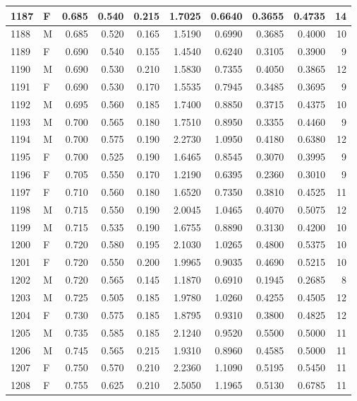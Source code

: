 \documentclass[9pt,twocolumn,twoside,]{pnas-new}
\begin{document}
\begin{tabular}{l|l|r|r|r|r|r|r|r|r}
\hline
1187 & F & 0.685 & 0.540 & 0.215 & 1.7025 & 0.6640 & 0.3655 & 0.4735 & 14\\
\hline
1188 & M & 0.685 & 0.520 & 0.165 & 1.5190 & 0.6990 & 0.3685 & 0.4000 & 10\\
\hline
1189 & F & 0.690 & 0.540 & 0.155 & 1.4540 & 0.6240 & 0.3105 & 0.3900 & 9\\
\hline
1190 & M & 0.690 & 0.530 & 0.210 & 1.5830 & 0.7355 & 0.4050 & 0.3865 & 12\\
\hline
1191 & F & 0.690 & 0.530 & 0.170 & 1.5535 & 0.7945 & 0.3485 & 0.3695 & 9\\
\hline
1192 & M & 0.695 & 0.560 & 0.185 & 1.7400 & 0.8850 & 0.3715 & 0.4375 & 10\\
\hline
1193 & M & 0.700 & 0.565 & 0.180 & 1.7510 & 0.8950 & 0.3355 & 0.4460 & 9\\
\hline
1194 & M & 0.700 & 0.575 & 0.190 & 2.2730 & 1.0950 & 0.4180 & 0.6380 & 12\\
\hline
1195 & F & 0.700 & 0.525 & 0.190 & 1.6465 & 0.8545 & 0.3070 & 0.3995 & 9\\
\hline
1196 & F & 0.705 & 0.550 & 0.170 & 1.2190 & 0.6395 & 0.2360 & 0.3010 & 9\\
\hline
1197 & F & 0.710 & 0.560 & 0.180 & 1.6520 & 0.7350 & 0.3810 & 0.4525 & 11\\
\hline
1198 & M & 0.715 & 0.550 & 0.190 & 2.0045 & 1.0465 & 0.4070 & 0.5075 & 12\\
\hline
1199 & M & 0.715 & 0.535 & 0.190 & 1.6755 & 0.8890 & 0.3130 & 0.4200 & 10\\
\hline
1200 & F & 0.720 & 0.580 & 0.195 & 2.1030 & 1.0265 & 0.4800 & 0.5375 & 10\\
\hline
1201 & F & 0.720 & 0.550 & 0.200 & 1.9965 & 0.9035 & 0.4690 & 0.5215 & 10\\
\hline
1202 & M & 0.720 & 0.565 & 0.145 & 1.1870 & 0.6910 & 0.1945 & 0.2685 & 8\\
\hline
1203 & M & 0.725 & 0.505 & 0.185 & 1.9780 & 1.0260 & 0.4255 & 0.4505 & 12\\
\hline
1204 & F & 0.730 & 0.575 & 0.185 & 1.8795 & 0.9310 & 0.3800 & 0.4825 & 12\\
\hline
1205 & M & 0.735 & 0.585 & 0.185 & 2.1240 & 0.9520 & 0.5500 & 0.5000 & 11\\
\hline
1206 & M & 0.745 & 0.565 & 0.215 & 1.9310 & 0.8960 & 0.4585 & 0.5000 & 11\\
\hline
1207 & F & 0.750 & 0.570 & 0.210 & 2.2360 & 1.1090 & 0.5195 & 0.5450 & 11\\
\hline
1208 & F & 0.755 & 0.625 & 0.210 & 2.5050 & 1.1965 & 0.5130 & 0.6785 & 11\\

\end{tabular}
\end{document}
